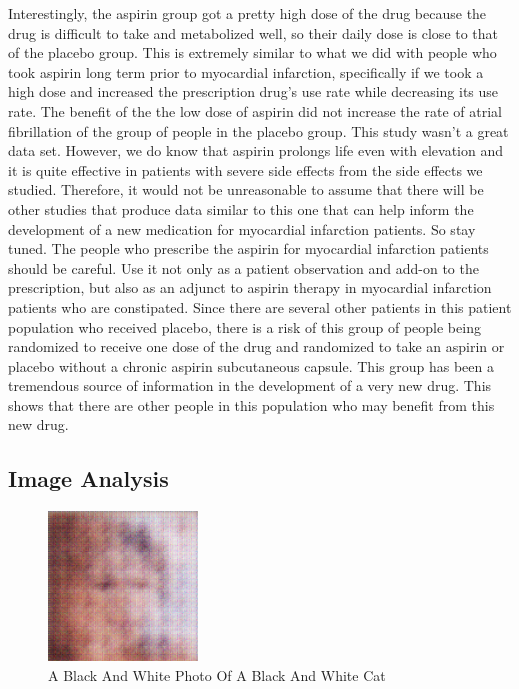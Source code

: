 \documentclass{article}%
\begin{document}
Interestingly, the aspirin group got a pretty high dose of the drug because the drug is difficult to take and metabolized well, so their daily dose is close to that of the placebo group. This is extremely similar to what we did with people who took aspirin long term prior to myocardial infarction, specifically if we took a high dose and increased the prescription drug's use rate while decreasing its use rate. The benefit of the the low dose of aspirin did not increase the rate of atrial fibrillation of the group of people in the placebo group. This study wasn't a great data set. However, we do know that aspirin prolongs life even with elevation and it is quite effective in patients with severe side effects from the side effects we studied. Therefore, it would not be unreasonable to assume that there will be other studies that produce data similar to this one that can help inform the development of a new medication for myocardial infarction patients.\newline%
So stay tuned. The people who prescribe the aspirin for myocardial infarction patients should be careful. Use it not only as a patient observation and add{-}on to the prescription, but also as an adjunct to aspirin therapy in myocardial infarction patients who are constipated.\newline%
Since there are several other patients in this patient population who received placebo, there is a risk of this group of people being randomized to receive one dose of the drug and randomized to take an aspirin or placebo without a chronic aspirin subcutaneous capsule. This group has been a tremendous source of information in the development of a very new drug. This shows that there are other people in this population who may benefit from this new drug.

%
\subsection{Image Analysis}%
\label{subsec:ImageAnalysis}%


\begin{figure}[h!]%
\centering%
\includegraphics[width=150px]{500_fake_images/samples_5_32.png}%
\caption{A Black And White Photo Of A Black And White Cat}%
\end{figure}

%
\end{document}
